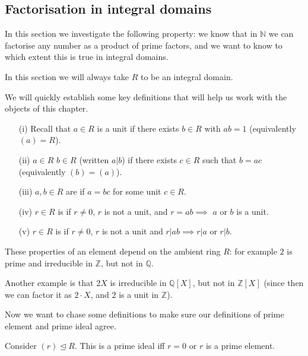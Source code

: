 \documentclass[egregdoesnotlikesansseriftitles,a4paper]{scrartcl}
\begin{document}
\subsection{Factorisation in integral domains}
In this section we investigate the following property: we know that in $\mathbb{N}$ we can factorise any number as a product of prime factors, and we want to know to which extent this is true in integral domains.
\begin{remark}
       In this section we will always take $R$ to be an integral domain.
\end{remark}
\begin{definition*}
       We will quickly establish some key definitions that will help us work with the objects of this chapter.
       \begin{itemize}
             \item[(i)] Recall that $a \in R$ is a unit if there exists $b \in R$ with $ab=1$ (equivalently $(a)=R$).
             \item[(ii)] $a \in R$  $b \in R $ (written $a|b$) if there exists $c \in R $ such that $b=ac$ (equivalently $(b)=(a)$).
             \item[(iii)] $a,b \in R$ are  if $a=bc $ for some unit $c \in R$. 
             \item[(iv)] $r \in R$ is  if $r \neq 0$, $r$ is not a unit, and $r=ab \implies$ $a$ or $b$ is a unit.
             \item[(v)] $r \in R$ is  if $r \neq 0$, $r $ is not a unit and $r| ab \implies r|a $ or $r|b$.
       \end{itemize}
       \begin{remark}
              These properties of an element depend on the ambient ring $R$: for example $2$ is prime and irreducible in $\mathbb{Z}$, but not in $\mathbb{Q}$. 

              Another example is that $2X$ is irreducible in $\mathbb{Q}[X]$, but not in $\mathbb{Z}[X]$ (since then we can factor it as $2 \cdot X$, and 2 is a unit in $\mathbb{Z}$).
       \end{remark}
\end{definition*}
Now we want to chase some definitions to make sure our definitions of prime element and prime ideal agree.
\begin{lemma}
       Consider $(r)\unlhd R$. This is a prime ideal iff $r=0$ or $r$ is a prime element.
\end{lemma}
\end{document}
